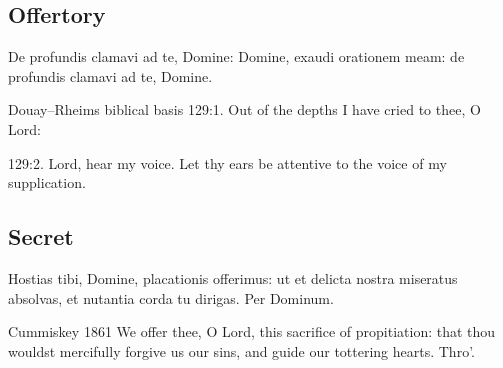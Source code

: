 \subsection{Offertory}
\label{proper-offertory}
\begin{latinproper}
De profundis clamavi ad te, Domine: Domine, exaudi orationem meam: de profundis clamavi ad te, Domine.
\end{latinproper}
\begin{englishwitness}{Douay--Rheims biblical basis}
129:1. Out of the depths I have cried to thee, O Lord:

129:2. Lord, hear my voice. Let thy ears be attentive to the voice of
my supplication.
\end{englishwitness}

\subsection{Secret}
\label{proper-secret}
\begin{latinproper}
Hostias tibi, Domine, placationis offerimus: ut et delicta nostra miseratus absolvas, et nutantia corda tu dirigas. Per Dominum.
\end{latinproper}
\begin{englishwitness}{Cummiskey 1861}
We offer thee, O Lord, this sacrifice of propitiation: that thou wouldst mercifully forgive us our sins, and guide our tottering hearts. Thro'.
\end{englishwitness}

